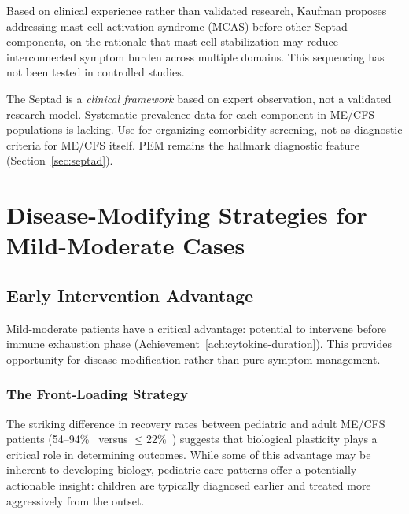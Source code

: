 \begin{assumption}
\label{ass:septad-sequencing}
Based on clinical experience rather than validated research, Kaufman proposes addressing mast cell activation syndrome (MCAS) before other Septad components, on the rationale that mast cell stabilization may reduce interconnected symptom burden across multiple domains. This sequencing has not been tested in controlled studies.
\end{assumption}

\begin{warning}
The Septad is a \emph{clinical framework} based on expert observation, not a validated research model. Systematic prevalence data for each component in ME/CFS populations is lacking. Use for organizing comorbidity screening, not as diagnostic criteria for ME/CFS itself. PEM remains the hallmark diagnostic feature (Section~\ref{sec:septad}).
\end{warning}

\section{Disease-Modifying Strategies for Mild-Moderate Cases}
\label{sec:disease-modifying-mild-moderate}

\subsection{Early Intervention Advantage}

Mild-moderate patients have a critical advantage: potential to intervene before immune exhaustion phase (Achievement~\ref{ach:cytokine-duration}). This provides opportunity for disease modification rather than pure symptom management.

\subsubsection{The Front-Loading Strategy}
\label{subsubsec:front-loading-strategy}

The striking difference in recovery rates between pediatric and adult ME/CFS patients (54--94\%~\cite{Joyce1997prognosis} versus $\leq$22\%~\cite{Cairns2005prognosis}) suggests that biological plasticity plays a critical role in determining outcomes. While some of this advantage may be inherent to developing biology, pediatric care patterns offer a potentially actionable insight: children are typically diagnosed earlier and treated more aggressively from the outset.

